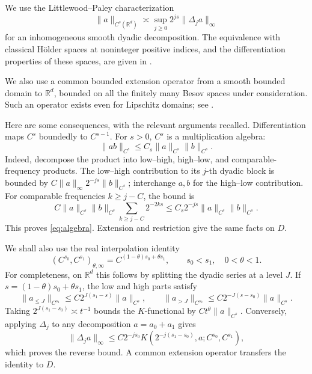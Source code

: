 \documentclass[11pt]{article}
\theoremstyle{remark}
\newcommand{\R}{\mathbb R}
\begin{document}
We use the Littlewood--Paley characterization
\begin{equation}\label{eq:LP}
\|a\|_{C^s(\R^d)}
\asymp \sup_{j\geq0}2^{js}\|\Delta_j a\|_\infty
\end{equation}
for an inhomogeneous smooth dyadic decomposition. The equivalence with
classical H\"older spaces at noninteger positive indices, and the
differentiation properties of these spaces, are given in
\cite[Chapter~13, Section~8]{Taylor}.

We also use a common bounded extension operator from a smooth bounded
domain to \(\R^d\), bounded on all the finitely many Besov spaces under
consideration. Such an operator exists even for Lipschitz domains;
see \cite{Rychkov}.

Here are some consequences, with the relevant arguments recalled.
Differentiation maps \(C^s\) boundedly to \(C^{s-1}\).
For \(s>0\), \(C^s\) is a multiplication algebra:
\begin{equation}\label{eq:algebra}
\|ab\|_{C^s}\leq C_s\|a\|_{C^s}\|b\|_{C^s}.
\end{equation}
Indeed, decompose the product into low--high, high--low, and
comparable-frequency products. The low--high contribution to its
\(j\)-th dyadic block is bounded by
\(C\|a\|_\infty 2^{-js}\|b\|_{C^s}\); interchange \(a,b\) for
the high--low contribution. For comparable frequencies \(k\geq j-C\),
the bound is
\[
C\|a\|_{C^s}\|b\|_{C^s}
\sum_{k\geq j-C}2^{-2ks}
\leq C_s2^{-js}\|a\|_{C^s}\|b\|_{C^s}.
\]
This proves \eqref{eq:algebra}. Extension and restriction give the same
facts on \(D\).

We shall also use the real interpolation identity
\begin{equation}\label{eq:interp}
(C^{s_0},C^{s_1})_{\theta,\infty}
=C^{(1-\theta)s_0+\theta s_1},
\qquad s_0<s_1,\quad 0<\theta<1.
\end{equation}
For completeness, on \(\R^d\) this follows by splitting the dyadic
series at a level \(J\). If \(s=(1-\theta)s_0+\theta s_1\), the low
and high parts satisfy
\[
\|a_{\leq J}\|_{C^{s_1}}
\leq C2^{J(s_1-s)}\|a\|_{C^s},\qquad
\|a_{>J}\|_{C^{s_0}}
\leq C2^{-J(s-s_0)}\|a\|_{C^s}.
\]
Taking \(2^{J(s_1-s_0)}\asymp t^{-1}\) bounds the \(K\)-functional
by \(Ct^\theta\|a\|_{C^s}\). Conversely, applying \(\Delta_j\) to
any decomposition \(a=a_0+a_1\) gives
\[
\|\Delta_j a\|_\infty
\leq C2^{-js_0}
K(2^{-j(s_1-s_0)},a;C^{s_0},C^{s_1}),
\]
which proves the reverse bound. A common extension operator transfers
the identity to \(D\).

\end{document}
